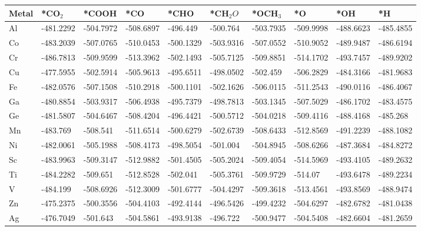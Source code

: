 \begin{table}[h]
  \centering
  {\fontsize{6}{12}\selectfont
  \begin{tabular}{*{10}{l}}
    \hline
    Metal & *CO$_2$ & *COOH    & *CO       & *CHO      & *CH$_2O$  & *OCH$_3$  & *O        & *OH       & *H        \\
    \hline
    Al & -481.2292 & -504.7972 & -508.6897 & -496.449  & -500.764  & -503.7935 & -509.9998 & -488.6623 & -485.4855 \\
    Co & -483.2039 & -507.0765 & -510.0453 & -500.1329 & -503.9316 & -507.0552 & -510.9052 & -489.9487 & -486.6194 \\
    Cr & -486.7813 & -509.9599 & -513.3962 & -502.1493 & -505.7125 & -509.8851 & -514.1702 & -493.7457 & -489.9202 \\
    Cu & -477.5955 & -502.5914 & -505.9613 & -495.6511 & -498.0502 & -502.459  & -506.2829 & -484.3166 & -481.9683 \\
    Fe & -482.0576 & -507.1508 & -510.2918 & -500.1101 & -502.1626 & -506.0115 & -511.2543 & -490.0116 & -486.4067 \\
    Ga & -480.8854 & -503.9317 & -506.4938 & -495.7379 & -498.7813 & -503.1345 & -507.5029 & -486.1702 & -483.4575 \\
    Ge & -481.5807 & -504.6467 & -508.4204 & -496.4421 & -500.5712 & -504.0218 & -509.4116 & -488.4168 & -485.268  \\
    Mn & -483.769  & -508.541  & -511.6514 & -500.6279 & -502.6739 & -508.6433 & -512.8569 & -491.2239 & -488.1082 \\
    Ni & -482.0061 & -505.1988 & -508.4173 & -498.5054 & -501.004  & -504.8945 & -508.6266 & -487.3684 & -484.8272 \\
    Sc & -483.9963 & -509.3147 & -512.9882 & -501.4505 & -505.2024 & -509.4054 & -514.5969 & -493.4105 & -489.2632 \\
    Ti & -484.2282 & -509.651  & -512.8528 & -502.041  & -505.3761 & -509.9729 & -514.07   & -493.6478 & -489.2234 \\
    V  & -484.199  & -508.6926 & -512.3009 & -501.6777 & -504.4297 & -509.3618 & -513.4561 & -493.8569 & -488.9474 \\
    Zn & -475.2375 & -500.3556 & -504.4103 & -492.4144 & -496.5426 & -499.4232 & -504.6297 & -482.6782 & -481.0438 \\
    Ag & -476.7049 & -501.643  & -504.5861 & -493.9138 & -496.722  & -500.9477 & -504.5408 & -482.6604 & -481.2659 \\

\end{tabular}}
\end{table}
